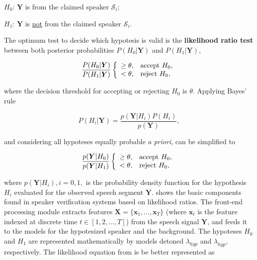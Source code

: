 \begin{description}\itemsep0pt
    \item $H_0$: $\boldsymbol{Y}$ is from the claimed speaker $\mathcal{S}_i$;
    \item $H_1$: $\boldsymbol{Y}$ is \underline{not} from the claimed speaker $\mathcal{S}_i$.
\end{description}

\noindent The optimum test to decide which hypotesis is valid is the \textbf{likelihood ratio test} between both posterior probabilities $P(H_0|\boldsymbol{Y})$ and $P(H_1|\boldsymbol{Y})$,

\begin{equation}
    \frac{P(H_0|\boldsymbol{Y})}{P(H_1|\boldsymbol{Y})} \verifytestB{\theta}{H_0}
    \label{eq:likelihood-ratio-test}
\end{equation}

\noindent where the decision threshold for accepting or rejecting $H_0$ is $\theta$. Applying Bayes' rule

\begin{equation}
    P(H_i|\boldsymbol{Y}) = \frac{p(\boldsymbol{Y}|H_i)P(H_i)}{p(\boldsymbol{Y})},
    \label{eq:bayes-for-hypotesis}
\end{equation}

\noindent and considering all hypoteses equally probable \textit{a priori},  can be simplified to

\begin{equation}
    \frac{p(\boldsymbol{Y}|H_0)}{p(\boldsymbol{Y}|H_1)} \verifytestB{\theta}{H_0}
    \label{eq:likelihood-ratio-test-2}
\end{equation}

\noindent where $p(\boldsymbol{Y}|H_i), i = 0, 1,$ is the probability density function for the hypothesis $H_i$ evaluated for the observed speech segment $\boldsymbol{Y}$.  shows the basic components found in speaker verification systems based on likelihood ratios. The front-end processing module extracts features $\boldsymbol{X} = \{\boldsymbol{x}_1, ..., \boldsymbol{x}_T\}$ (where $\boldsymbol{x}_t$ is the feature indexed at discrete time $t \in [1, 2, ..., T]$) from the speech signal $\boldsymbol{Y}$, and feeds it to the models for the hypotesized speaker and the background. The hypoteses $H_0$ and $H_1$ are represented mathematically by models detoned $\lambda_{hyp}$ and $\lambda_{\overline{hyp}}$, respectively. The likelihood equation from  is be better represented as

